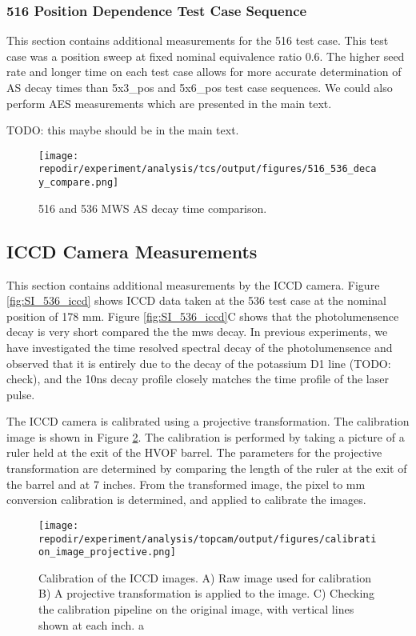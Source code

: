 \clearpage
\subsubsection{516 Position Dependence Test Case Sequence}

This section contains additional measurements for the 516 test case. This test case was a position sweep at fixed nominal equivalence ratio 0.6. The higher seed rate and longer time on each test case allows for more accurate determination of AS decay times than 5x3\_pos and 5x6\_pos test case sequences. We could also perform AES measurements which are presented in the main text. 

TODO: this maybe should be in the main text.

\begin{figure}[]
\centering
\texttt{[image: \\repodir/experiment/analysis/tcs/output/figures/516\_536\_decay\_compare.png]}
\caption{516 and 536 MWS AS decay time comparison.}
\label{fig:SI_516_mws_decaytime}
\end{figure}


\clearpage
\subsection{ICCD Camera Measurements}

This section contains additional measurements by the ICCD camera. Figure \ref{fig:SI_536_iccd} shows ICCD data taken at the 536 test case at the nominal position of 178 mm. Figure \ref{fig:SI_536_iccd}C shows that the photolumensence decay is very short compared the the mws decay. In previous experiments, we have investigated the time resolved spectral decay of the photolumensence and observed that it is entirely due to the decay of the potassium D1 line (TODO: check), and the 10ns decay profile closely matches the time profile of the laser pulse. 

The ICCD camera is calibrated using a projective transformation. The calibration image is shown in Figure \ref{fig:SI_iccd_calibration}. The calibration is performed by taking a picture of a ruler held at the exit of the HVOF barrel. The parameters for the projective transformation are determined by comparing the length of the ruler at the exit of the barrel and at 7 inches. From the transformed image, the pixel to mm conversion calibration is determined, and applied to calibrate the images. 

\begin{figure}[]
\centering
\texttt{[image: \\repodir/experiment/analysis/topcam/output/figures/calibration\_image\_projective.png]}
\caption{Calibration of the ICCD images. A) Raw image used for calibration B) A projective transformation is applied to the image. C) Checking the calibration pipeline on the original image, with vertical lines shown at each inch. a}
\label{fig:SI_iccd_calibration}
\end{figure}

